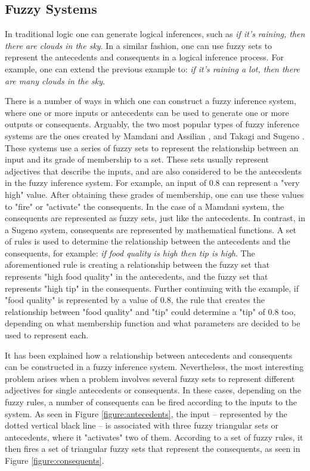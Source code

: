 \subsection{Fuzzy Systems}
\label{subsection:fuzzy-systems}

In traditional logic one can generate logical inferences, such as \textit{if it's raining, then there are clouds in the sky}. In a similar fashion, one can use fuzzy sets to represent the antecedents and consequents in a logical inference process. For example, one can extend the previous example to: \textit{if it's raining a lot, then there are many clouds in the sky}.

There is a number of ways in which one can construct a fuzzy inference system, where one or more inputs or antecedents can be used to generate one or more outputs or consequents. Arguably, the two most popular types of fuzzy inference systems are the ones created by Mamdani and Assilian \cite{Mamdani1975}, and Takagi and Sugeno \cite{Takagi1985}. These systems use a series of fuzzy sets to represent the relationship between an input and its grade of membership to a set. These sets usually represent adjectives that describe the inputs, and are also considered to be the antecedents in the fuzzy inference system. For example, an input of 0.8 can represent a "very high" value. After obtaining these grades of membership, one can use these values to "fire" or "activate" the consequents. In the case of a Mamdani system, the consequents are represented as fuzzy sets, just like the antecedents. In contrast, in a Sugeno system, consequents are represented by mathematical functions. A set of rules is used to determine the relationship between the antecedents and the consequents, for example: \textit{if food quality is high then tip is high}. The aforementioned rule is creating a relationship between the fuzzy set that represents "high food quality" in the antecedents, and the fuzzy set that represents "high tip" in the consequents. Further continuing with the example, if "food quality" is represented by a value of 0.8, the rule that creates the relationship between "food quality" and "tip" could determine a "tip" of 0.8 too, depending on what membership function and what parameters are decided to be used to represent each.

It has been explained how a relationship between antecedents and consequents can be constructed in a fuzzy inference system. Nevertheless, the most interesting problem arises when a problem involves several fuzzy sets to represent different adjectives for single antecedents or consequents. In these cases, depending on the fuzzy rules, a number of consequents can be fired according to the inputs to the system. As seen in Figure \ref{figure:antecedents}, the input -- represented by the dotted vertical black line -- is associated with three fuzzy triangular sets or antecedents, where it "activates" two of them. According to a set of fuzzy rules, it then fires a set of triangular fuzzy sets that represent the consequents, as seen in Figure \ref{figure:consequents}.


